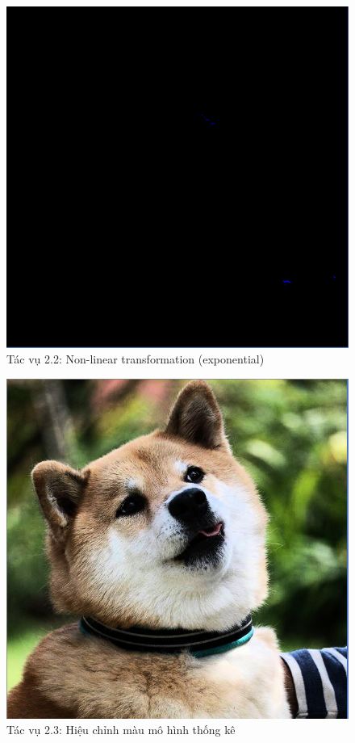 \documentclass{article}
\begin{document}
		\begin{figure}[H]
			\centering
			\includegraphics[scale = 0.4]{22e}
			\caption{Tác vụ 2.2: Non-linear transformation (exponential)}
		\end{figure}
	\begin{figure}[H]
		\centering
		\includegraphics[scale = 0.4]{23histogram}
		\caption{Tác vụ 2.3: Hiệu chỉnh màu mô hình thống kê}
	\end{figure}
	
\end{document}
